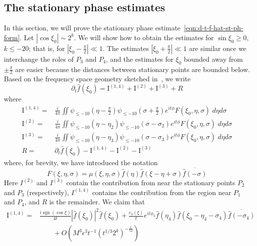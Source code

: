 \documentclass[letterpaper, reqno,final]{amsart}
\DeclareMathOperator{\sgn}{sgn}
\newcommand{\fhPi}{\frac{\pi}{2}}
\newcommand{\rmI}{\mathrm{I}}
\newcommand{\bigO}[1]{O\left({#1}\right)}
\newcommand{\stPhErr}{{\frac{1}{52}}}
\begin{document}
\subsection{The stationary phase estimates}

In this section, we will prove the stationary phase estimate~\eqref{eqn:d-t-f-hat-st-ph-form}.  Let $|\cos \xi_0| \sim 2^k$.  We will show how to obtain the estimates for $\sin \xi_0 \geq 0$, $k \leq -20$; that is, for $|\xi_0 - \fhPi| \ll 1$.  The estimates $|\xi_0 + \fhPi| \ll 1$ are similar once we interchange the roles of $P_3$ and $P_4$, and the estimates for $\xi_0$ bounded away from $\pm \fhPi$ are easier because the distances between stationary points are bounded below.  Based on the frequency space geometry sketched in~, we write
\begin{equation*}
    \partial_t \hat{f}(\xi_0) = \rmI^{(1,4)} + \rmI^{(2)} + \rmI^{(3)} + R
\end{equation*}
where
\begin{equation*}\begin{split}
    \rmI^{(1,4)} =& \frac{i}{4\pi} \iint  \psi_{\leq -10}(\eta - \fhPi) \psi_{\leq -10}(\sigma + \fhPi) e^{it\phi} F(\xi_0,\eta,\sigma)\;d\eta d\sigma\\
    \rmI^{(2)} =& \frac{i}{4\pi} \iint \psi_{\leq -10}(\eta - \eta_2) \psi_{\leq -10}(\sigma -\sigma_2) e^{it\phi} F(\xi_0,\eta,\sigma)\;d\eta d\sigma\\
    \rmI^{(3)} =& \frac{i}{4\pi} \iint \psi_{\leq -10}(\eta - \eta_3) \psi_{\leq -10}(\sigma -\sigma_3) e^{it\phi} F(\xi_0,\eta,\sigma)\;d\eta d\sigma\\
    R =& \partial_t \hat{f}(\xi_0) - \rmI^{(1,4)} - \rmI^{(2)} - \rmI^{(3)}
\end{split}\end{equation*}
where, for brevity, we have introduced the notation
\begin{equation*}
    F(\xi, \eta, \sigma) = \mu(\xi, \eta,\sigma) \hat{f}(\eta) \hat{f}(\xi - \eta + \sigma) \overline{\hat{f}(-\sigma)}
\end{equation*}
Here $I^{(2)}$ and $I^{(3)}$ contain the contribution from near the stationary points $P_2$ and $P_3$ (respectively), $I^{(1,4)}$ contains the contribution from the region near $P_1$ and $P_4$, and $R$ is the remainder.  We claim that
\begin{equation}\label{eqn:st-ph-I14}\begin{split}
    \rmI^{(1,4)} =& \frac{i \sgn(\cos \xi)}{4t}|\hat{f}(\xi_0)|^2\hat{f}(\xi_0) + \frac{c_4(\xi)}{t}e^{it\phi_3}\hat{f}(\eta_4)\hat{f}(\xi_0 - \eta_4 - \sigma_4) \overline{\hat{f}(-\sigma_4)} \\
    &\qquad + \bigO{M^3\epsilon^3 t^{-1} \left(t^{1/3} 2^k\right)^{-\stPhErr}}
\end{split}\end{equation}
\end{document}
